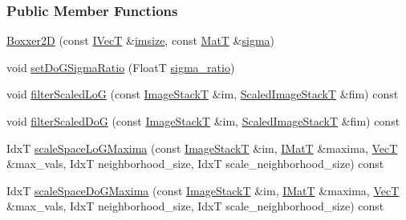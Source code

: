 \subsubsection*{Public Member Functions}
\begin{DoxyCompactItemize}
\item 
\hyperlink{classboxxer_1_1Boxxer2D_a9f87f606cf304f6006d055ef20d25f73}{Boxxer2D} (const \hyperlink{classboxxer_1_1Boxxer2D_acb4dc89c7e1bd2099e7de7b83621ba4f}{I\+VecT} \&\hyperlink{classboxxer_1_1Boxxer2D_a6f76692e32f0c907d48a72a801a62b9a}{imsize}, const \hyperlink{classboxxer_1_1Boxxer2D_a4af9f3e10a7ceb1c20e1d731263d9aeb}{MatT} \&\hyperlink{classboxxer_1_1Boxxer2D_a925fe4151cca3a34cba36f1a10b8e382}{sigma})
\item 
void \hyperlink{classboxxer_1_1Boxxer2D_a9fcfdebe9f2896232c50b482005db219}{set\+Do\+G\+Sigma\+Ratio} (FloatT \hyperlink{classboxxer_1_1Boxxer2D_a0fffedee4a39644c5c48fba99e297111}{sigma\+\_\+ratio})
\item 
void \hyperlink{classboxxer_1_1Boxxer2D_a3291815bf3f9a0762f542bfe636b6da4}{filter\+Scaled\+LoG} (const \hyperlink{classboxxer_1_1Boxxer2D_a35da86be183f5f24cb3d13cbf7cf45ee}{Image\+StackT} \&im, \hyperlink{classboxxer_1_1Boxxer2D_a2937a772edcf9cec5f617fbcf1d8a6fe}{Scaled\+Image\+StackT} \&fim) const 
\item 
void \hyperlink{classboxxer_1_1Boxxer2D_a35393374b3c73f09c7a6a4a45ec82856}{filter\+Scaled\+DoG} (const \hyperlink{classboxxer_1_1Boxxer2D_a35da86be183f5f24cb3d13cbf7cf45ee}{Image\+StackT} \&im, \hyperlink{classboxxer_1_1Boxxer2D_a2937a772edcf9cec5f617fbcf1d8a6fe}{Scaled\+Image\+StackT} \&fim) const 
\item 
IdxT \hyperlink{classboxxer_1_1Boxxer2D_ad5dffcdf4797f49541b9c44c9551987a}{scale\+Space\+Lo\+G\+Maxima} (const \hyperlink{classboxxer_1_1Boxxer2D_a35da86be183f5f24cb3d13cbf7cf45ee}{Image\+StackT} \&im, \hyperlink{classboxxer_1_1Boxxer2D_ad6e571d3e7685b8c634661e03382a32f}{I\+MatT} \&maxima, \hyperlink{classboxxer_1_1Boxxer2D_aeb45bfe57b8975660fc7076a2794acf8}{VecT} \&max\+\_\+vals, IdxT neighborhood\+\_\+size, IdxT scale\+\_\+neighborhood\+\_\+size) const 
\item 
IdxT \hyperlink{classboxxer_1_1Boxxer2D_ad3d93a33dcef252f4f0be57a27535f6e}{scale\+Space\+Do\+G\+Maxima} (const \hyperlink{classboxxer_1_1Boxxer2D_a35da86be183f5f24cb3d13cbf7cf45ee}{Image\+StackT} \&im, \hyperlink{classboxxer_1_1Boxxer2D_ad6e571d3e7685b8c634661e03382a32f}{I\+MatT} \&maxima, \hyperlink{classboxxer_1_1Boxxer2D_aeb45bfe57b8975660fc7076a2794acf8}{VecT} \&max\+\_\+vals, IdxT neighborhood\+\_\+size, IdxT scale\+\_\+neighborhood\+\_\+size) const 

\end{DoxyCompactItemize}
